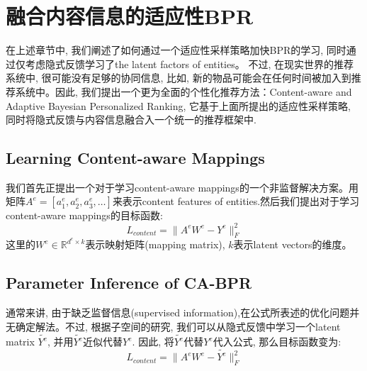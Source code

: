 \section{融合内容信息的适应性BPR}
在上述章节中, 我们阐述了如何通过一个适应性采样策略加快BPR的学习, 同时通过仅考虑隐式反馈学习了the latent factors of entities。 不过, 在现实世界的推荐系统中, 很可能没有足够的协同信息, 比如, 新的物品可能会在任何时间被加入到推荐系统中。因此, 我们提出一个更为全面的个性化推荐方法：Content-aware and Adaptive Bayesian Personalized Ranking, 它基于上面所提出的适应性采样策略, 同时将隐式反馈与内容信息融合入一个统一的推荐框架中.


\subsection{Learning Content-aware Mappings}
我们首先正提出一个对于学习content-aware mappings的一个非监督解决方案。用矩阵$A^e = \left[a_1^e,a_2^e,a_3^e,\dots\right]$来表示content features of entities.然后我们提出对于学习content-aware mappings的目标函数:
\begin{equation}
L_{content} = \| A^eW^e - Y^e\|_F^2
\end{equation}
这里的$W^e \in \mathbb{R}^{d^e \times k}$表示映射矩阵(mapping matrix), $k$表示latent vectors的维度。




\subsection{Parameter Inference of CA-BPR}
通常来讲, 由于缺乏监督信息(supervised information),在公式所表述的优化问题并无确定解法。不过, 根据子空间的研究, 我们可以从隐式反馈中学习一个latent matrix $\widetilde{Y^e}$, 并用$\widetilde{Y^e}$近似代替$Y^e$. 因此, 将$\widetilde{Y^e}$代替$Y^e$代入公式, 那么目标函数变为: 
\begin{equation}
L_{content} = \| A^eW^e - \widetilde{Y^e}\|_F^2
\end{equation}

